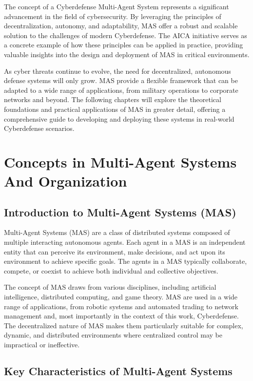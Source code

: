 The concept of a Cyberdefense Multi-Agent System represents a significant advancement in the field of cybersecurity. By leveraging the principles of decentralization, autonomy, and adaptability, MAS offer a robust and scalable solution to the challenges of modern Cyberdefense. The AICA initiative serves as a concrete example of how these principles can be applied in practice, providing valuable insights into the design and deployment of MAS in critical environments.

As cyber threats continue to evolve, the need for decentralized, autonomous defense systems will only grow. MAS provide a flexible framework that can be adapted to a wide range of applications, from military operations to corporate networks and beyond. The following chapters will explore the theoretical foundations and practical applications of MAS in greater detail, offering a comprehensive guide to developing and deploying these systems in real-world Cyberdefense scenarios.



\section{Concepts in Multi-Agent Systems And Organization}

\subsection{Introduction to Multi-Agent Systems (MAS)}

Multi-Agent Systems (MAS) are a class of distributed systems composed of multiple interacting autonomous agents. Each agent in a MAS is an independent entity that can perceive its environment, make decisions, and act upon its environment to achieve specific goals. The agents in a MAS typically collaborate, compete, or coexist to achieve both individual and collective objectives.

The concept of MAS draws from various disciplines, including artificial intelligence, distributed computing, and game theory. MAS are used in a wide range of applications, from robotic systems and automated trading to network management and, most importantly in the context of this work, Cyberdefense. The decentralized nature of MAS makes them particularly suitable for complex, dynamic, and distributed environments where centralized control may be impractical or ineffective.

\subsection{Key Characteristics of Multi-Agent Systems}

